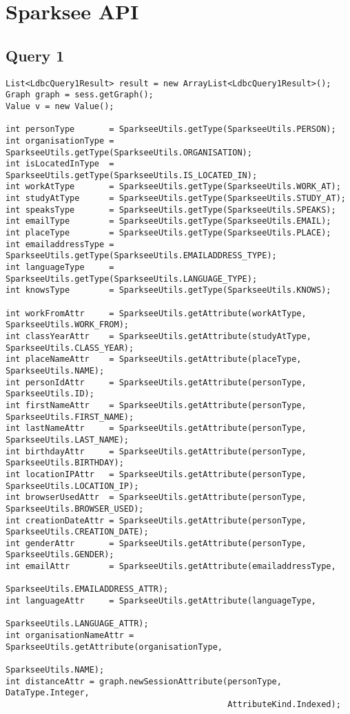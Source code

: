 \section{Sparksee API}

\subsection{Query 1}
{\footnotesize
\begin{verbatim}
List<LdbcQuery1Result> result = new ArrayList<LdbcQuery1Result>();
Graph graph = sess.getGraph();
Value v = new Value();

int personType       = SparkseeUtils.getType(SparkseeUtils.PERSON);
int organisationType = SparkseeUtils.getType(SparkseeUtils.ORGANISATION);
int isLocatedInType  = SparkseeUtils.getType(SparkseeUtils.IS_LOCATED_IN);
int workAtType       = SparkseeUtils.getType(SparkseeUtils.WORK_AT);
int studyAtType      = SparkseeUtils.getType(SparkseeUtils.STUDY_AT);
int speaksType       = SparkseeUtils.getType(SparkseeUtils.SPEAKS);
int emailType        = SparkseeUtils.getType(SparkseeUtils.EMAIL);
int placeType        = SparkseeUtils.getType(SparkseeUtils.PLACE);
int emailaddressType = SparkseeUtils.getType(SparkseeUtils.EMAILADDRESS_TYPE);
int languageType     = SparkseeUtils.getType(SparkseeUtils.LANGUAGE_TYPE);
int knowsType        = SparkseeUtils.getType(SparkseeUtils.KNOWS);

int workFromAttr     = SparkseeUtils.getAttribute(workAtType,  SparkseeUtils.WORK_FROM);
int classYearAttr    = SparkseeUtils.getAttribute(studyAtType, SparkseeUtils.CLASS_YEAR);
int placeNameAttr    = SparkseeUtils.getAttribute(placeType,  SparkseeUtils.NAME);
int personIdAttr     = SparkseeUtils.getAttribute(personType, SparkseeUtils.ID);
int firstNameAttr    = SparkseeUtils.getAttribute(personType, SparkseeUtils.FIRST_NAME);
int lastNameAttr     = SparkseeUtils.getAttribute(personType, SparkseeUtils.LAST_NAME);
int birthdayAttr     = SparkseeUtils.getAttribute(personType, SparkseeUtils.BIRTHDAY);
int locationIPAttr   = SparkseeUtils.getAttribute(personType, SparkseeUtils.LOCATION_IP);
int browserUsedAttr  = SparkseeUtils.getAttribute(personType, SparkseeUtils.BROWSER_USED);
int creationDateAttr = SparkseeUtils.getAttribute(personType, SparkseeUtils.CREATION_DATE);
int genderAttr       = SparkseeUtils.getAttribute(personType, SparkseeUtils.GENDER);
int emailAttr        = SparkseeUtils.getAttribute(emailaddressType, 
                                                  SparkseeUtils.EMAILADDRESS_ATTR);
int languageAttr     = SparkseeUtils.getAttribute(languageType,
                                                  SparkseeUtils.LANGUAGE_ATTR);
int organisationNameAttr = SparkseeUtils.getAttribute(organisationType, 
                                                      SparkseeUtils.NAME);
int distanceAttr = graph.newSessionAttribute(personType, DataType.Integer, 
                                             AttributeKind.Indexed);


\end{verbatim}}
